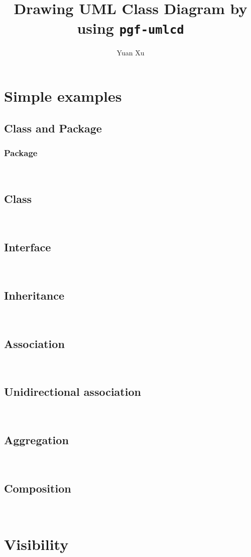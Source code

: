 \documentclass{article}
\newcommand{\demo}[1]{
\begin{minipage}{.5\linewidth}

\end{minipage}~~~~~~~~~~~~~~
\begin{minipage}{.45\linewidth}
\resizebox{\linewidth}{!}{

}
\end{minipage}
}
\begin{document}
\title{Drawing UML Class Diagram by using \texttt{pgf-umlcd}}
\author{Yuan Xu}
\maketitle

\tableofcontents

\section{Simple examples}
\subsection{Class and Package}

\subsubsection{Package}
\demo{package}

\subsection{Class}
\demo{class}

\subsection{Interface}
\demo{interface}

\subsection{Inheritance}
\demo{inheritance}
 
\subsection{Association} 
\demo{association}
 
\subsection{Unidirectional association}
\demo{unidirectional-association}

\subsection{Aggregation}
\demo{aggregation}

\subsection{Composition}
\demo{composition}

\section{Visibility}
\demo{visibility}
 
\end{document}
